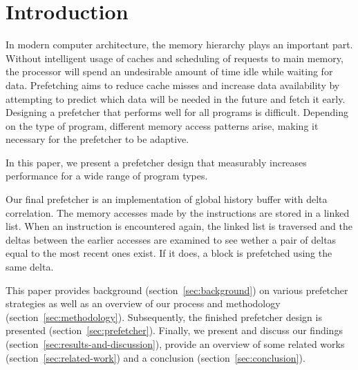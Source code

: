 \section{Introduction}
\label{sec:introduction}

In modern computer architecture, the memory hierarchy plays an important part.
Without intelligent usage of caches and scheduling of requests to main memory, the processor will spend an undesirable amount of time idle while waiting for data.
Prefetching aims to reduce cache misses and increase data availability by attempting to predict which data will be needed in the future and fetch it early. 
Designing a prefetcher that performs well for all programs is difficult.
Depending on the type of program, different memory access patterns arise, making it necessary for the prefetcher to be adaptive.

In this paper, we present a prefetcher design that measurably increases performance for a wide range of program types.

Our final prefetcher is an implementation of global history buffer with delta correlation.
The memory accesses made by the instructions are stored in a linked list.
When an instruction is encountered again, the linked list is traversed and the deltas between the earlier accesses are examined to see wether a pair of deltas equal to the most recent ones exist.
If it does, a block is prefetched using the same delta.

This paper provides background (section~\ref{sec:background}) on various prefetcher strategies as well as an overview of our process and methodology (section~\ref{sec:methodology}).
Subsequently, the finished prefetcher design is presented (section~\ref{sec:prefetcher}).
Finally, we present and discuss our findings (section~\ref{sec:results-and-discussion}), provide an overview of some related works (section~\ref{sec:related-work}) and a conclusion (section~\ref{sec:conclusion}).

